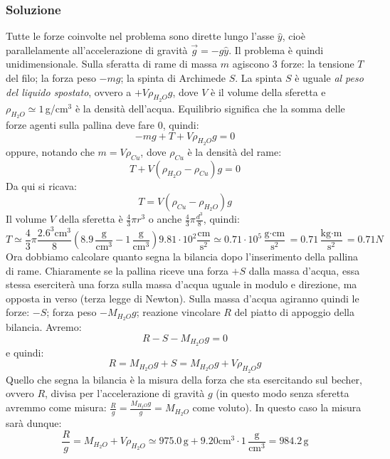 \documentclass[12pt,a4paper]{book}
\begin{document}
\subsubsection*{Soluzione}
Tutte le forze coinvolte nel problema sono dirette lungo l'asse $\hat{y}$, cioè parallelamente all'accelerazione di gravità $\vec{g}=-g \hat{y}$. Il problema è quindi unidimensionale.  Sulla sferatta di rame di massa $m$ agiscono 3 forze: la tensione $T$ del filo; la forza peso $-mg$; la spinta di Archimede $S$. La spinta $S$ è uguale \textit{al peso del liquido spostato}, ovvero a $+V\rho_{H_2 O} g$, dove $V$ è il volume della sferetta e $\rho_{H_2 O}\simeq 1 \,$g/cm$^3$ è la densità dell'acqua. Equilibrio significa che la somma delle forze agenti sulla pallina deve fare 0, quindi:
\begin{equation*}
-mg+T+V\rho_{H_2 O} g=0
\end{equation*}
oppure, notando che $m=V\rho_{Cu}$, dove $\rho_{Cu}$ è la densità del rame:
\begin{equation*}
T+V(\rho_{H_2 O}-\rho_{Cu}) g=0
\end{equation*}
Da qui si ricava:
\begin{equation*}
T=V(\rho_{Cu}-\rho_{H_2 O}) g
\end{equation*}
Il volume $V$ della sferetta è $\frac{4}{3}\pi r^3$ o anche $\frac{4}{3}\pi \frac{d^3}{8}$, quindi:
\begin{equation*}
T\simeq \frac{4}{3}\pi \frac{2.6^3 \text{cm}^3}{8} (8.9 \, \frac{\text{g}}{\text{cm}^3}-1 \, \frac{\text{g}}{\text{cm}^3}) 9.81 \cdot 10^2 \frac{\text{cm}}{\text{s}^2}\simeq 0.71 \cdot 10^5 \frac{\text{g} \cdot \text{cm}}{\text{s}^2} = 0.71  \frac{\text{kg} \cdot \text{m}}{\text{s}^2} = 0.71 N 
\end{equation*}
Ora dobbiamo calcolare quanto segna la bilancia dopo l'inserimento della pallina di rame. 
Chiaramente se la pallina riceve una forza $+S$ dalla massa d'acqua, essa stessa eserciterà una forza 
sulla massa d'acqua uguale in modulo e direzione, ma opposta in verso (terza legge di Newton). 
Sulla massa d'acqua agiranno quindi le forze: $-S$; forza peso $-M_{H_2 O} g$; reazione vincolare $R$ del piatto di appoggio della bilancia. Avremo:
\begin{equation*}
R-S-M_{H_2 O} g=0
\end{equation*}
e quindi:
\begin{equation*}
R=M_{H_2 O} g+S=M_{H_2 O} g+V\rho_{H_2 O} g
\end{equation*}
Quello che segna la bilancia è la misura della forza che sta esercitando sul becher, ovvero $R$, divisa per l'accelerazione di gravità $g$ 
(in questo modo senza sferetta avremmo come misura: $\frac{R}{g}=\frac{M_{H_2 O} g}{g}=M_{H_2 O}$ come voluto). In questo caso
la misura sarà dunque:
\begin{equation*}
\frac{R}{g}=M_{H_2 O}+V\rho_{H_2 O} \simeq 975.0 \, \text{g} + 9.20 \text{cm}^3 \cdot 1\,\frac{\text{g}}{\text{cm}^3} = 984.2 \, \text{g} 
\end{equation*}
\end{document}

